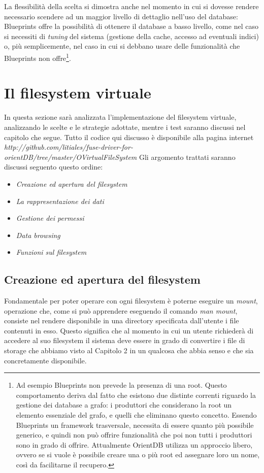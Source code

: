 La flessibilità della scelta si dimostra anche nel momento in cui si dovesse rendere necessario scendere ad un maggior livello di dettaglio nell'uso del database: Blueprints offre la possibilità di ottenere il database a basso livello, come nel caso si necessiti di \emph{tuning} del sistema (gestione della cache, accesso ad eventuali indici) o, più semplicemente, nel caso in cui si debbano usare delle funzionalità che Blueprints non offre\footnote{Ad esempio Blueprints non prevede la presenza di una root. Questo comportamento deriva dal fatto che esistono due distinte correnti riguardo la gestione dei database a grafo: i produttori che considerano la root un elemento essenziale del grafo, e quelli che eliminano questo concetto. Essendo Blueprints un framework trasversale, necessita di essere quanto più possibile generico, e quindi non può offrire funzionalità che poi non tutti i produttori sono in grado di offrire. Attualmente OrientDB utilizza un approccio libero, ovvero se si vuole è possibile creare una o più root ed assegnare loro un nome, così da facilitarne il recupero.}.

\section{Il filesystem virtuale}
In questa sezione sarà analizzata l'implementazione del filesystem virtuale, analizzando le scelte e le strategie adottate, mentre i test saranno discussi nel capitolo che segue.
Tutto il codice qui discusso è disponibile alla pagina internet \emph{http://github.com/litiales/fuse-driver-for-orientDB/tree/master/OVirtualFileSystem}
Gli argomento trattati saranno discussi seguento questo ordine:
\begin{itemize}
\item \emph{Creazione ed apertura del filesystem}
\item \emph{La rappresentazione dei dati}
\item \emph{Gestione dei permessi}
\item \emph{Data browsing}
\item \emph{Funzioni sul filesystem}
\end{itemize}

\subsection{Creazione ed apertura del filesystem}
Fondamentale per poter operare con ogni filesystem è poterne eseguire un \emph{mount}, operazione che, come si può apprendere eseguendo il comando \emph{man mount}, consiste nel rendere disponibile in una directory specificata dall'utente i file contenuti in esso. 
Questo significa che al momento in cui un utente richiederà di accedere al suo filesystem il sistema deve essere in grado di convertire i file di storage che abbiamo visto al Capitolo 2 in un qualcosa che abbia senso e che sia concretamente disponibile.

